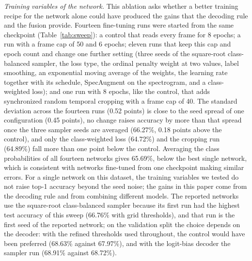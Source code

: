 \documentclass[pdflatex,sn-basic]{sn-jnl}
\begin{document}
\emph{Training variables of the network.} This ablation asks whether a better training recipe for the network alone could have produced the gains that the decoding rule and the fusion provide. Fourteen fine-tuning runs were started from the same checkpoint (Table~\ref{tab:sweep}): a control that reads every frame for 8 epochs; a run with a frame cap of 50 and 6 epochs; eleven runs that keep this cap and epoch count and change one further setting (three seeds of the square-root class-balanced sampler, the loss type, the ordinal penalty weight at two values, label smoothing, an exponential moving average of the weights, the learning rate together with its schedule, SpecAugment on the spectrogram, and a class-weighted loss); and one run with 8 epochs, like the control, that adds synchronized random temporal cropping with a frame cap of 40. The standard deviation across the fourteen runs (0.52 points) is close to the seed spread of one configuration (0.45 points), no change raises accuracy by more than that spread once the three sampler seeds are averaged (66.27\%, 0.18 points above the control), and only the class-weighted loss (64.72\%) and the cropping run (64.89\%) fall more than one point below the control. Averaging the class probabilities of all fourteen networks gives 65.69\%, below the best single network, which is consistent with networks fine-tuned from one checkpoint making similar errors. For a single network on this dataset, the training variables we tested do not raise top-1 accuracy beyond the seed noise; the gains in this paper come from the decoding rule and from combining different models. The reported networks use the square-root class-balanced sampler because its first run had the highest test accuracy of this sweep (66.76\% with grid thresholds), and that run is the first seed of the reported network; on the validation split the choice depends on the decoder: with the refined thresholds used throughout, the control would have been preferred (68.63\% against 67.97\%), and with the logit-bias decoder the sampler run (68.91\% against 68.72\%).
\end{document}

